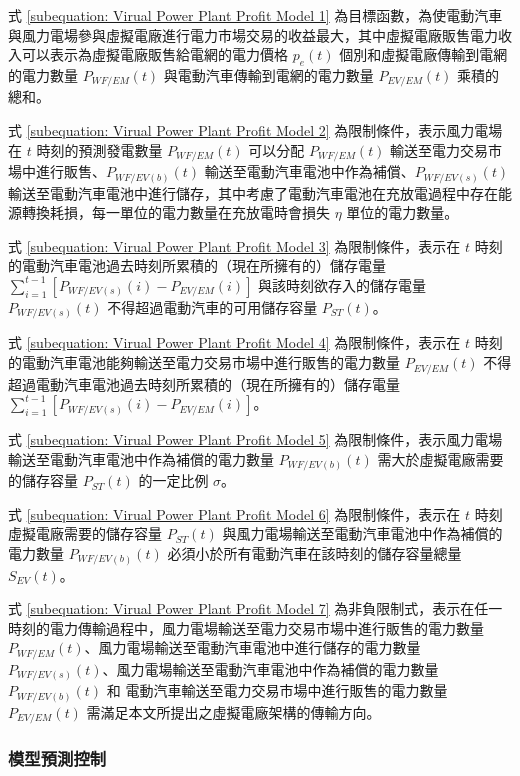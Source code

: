 式 \eqref{subequation: Virual Power Plant Profit Model 1} 為目標函數，為使電動汽車與風力電場參與虛擬電廠進行電力市場交易的收益最大，其中虛擬電廠販售電力收入可以表示為虛擬電廠販售給電網的電力價格 $p_{e} (t)$ 個別和虛擬電廠傳輸到電網的電力數量 $P_{WF/EM}(t)$ 與電動汽車傳輸到電網的電力數量 $P_{EV/EM}(t)$ 乘積的總和。

式 \eqref{subequation: Virual Power Plant Profit Model 2} 為限制條件，表示風力電場在 $t$ 時刻的預測發電數量 $P_{WF/EM}(t)$ 可以分配 $P_{WF/EM}(t)$ 輸送至電力交易市場中進行販售、$P_{WF/EV(b)}(t)$ 輸送至電動汽車電池中作為補償、$P_{WF/EV(s)}(t)$ 輸送至電動汽車電池中進行儲存，其中考慮了電動汽車電池在充放電過程中存在能源轉換耗損，每一單位的電力數量在充放電時會損失 $\eta$ 單位的電力數量。

式 \eqref{subequation: Virual Power Plant Profit Model 3} 為限制條件，表示在 $t$ 時刻的電動汽車電池過去時刻所累積的（現在所擁有的）儲存電量 $\sum_{i=1}^{t-1} \left[ P_{WF/EV(s)}(i) - P_{EV/EM}(i) \right]$ 與該時刻欲存入的儲存電量 $P_{WF/EV(s)}(t)$ 不得超過電動汽車的可用儲存容量 $P_{ST}(t)$。

式 \eqref{subequation: Virual Power Plant Profit Model 4} 為限制條件，表示在 $t$ 時刻的電動汽車電池能夠輸送至電力交易市場中進行販售的電力數量 $P_{EV/EM}(t)$ 不得超過電動汽車電池過去時刻所累積的（現在所擁有的）儲存電量 $\sum_{i=1}^{t-1} \left[ P_{WF/EV(s)}(i) - P_{EV/EM}(i) \right]$。

式 \eqref{subequation: Virual Power Plant Profit Model 5} 為限制條件，表示風力電場輸送至電動汽車電池中作為補償的電力數量 $P_{WF/EV(b)}(t)$
 需大於虛擬電廠需要的儲存容量 $P_{ST}(t)$ 的一定比例 $\sigma$。

式 \eqref{subequation: Virual Power Plant Profit Model 6} 為限制條件，表示在 $t$ 時刻虛擬電廠需要的儲存容量 $P_{ST}(t)$ 與風力電場輸送至電動汽車電池中作為補償的電力數量 $P_{WF/EV(b)}(t)$ 必須小於所有電動汽車在該時刻的儲存容量總量 $S_{EV}(t)$。

式 \eqref{subequation: Virual Power Plant Profit Model 7} 為非負限制式，表示在任一時刻的電力傳輸過程中，風力電場輸送至電力交易市場中進行販售的電力數量 $P_{WF/EM}(t)$、風力電場輸送至電動汽車電池中進行儲存的電力數量 $P_{WF/EV(s)}(t)$、風力電場輸送至電動汽車電池中作為補償的電力數量 $P_{WF/EV(b)}(t)$ 和 電動汽車輸送至電力交易市場中進行販售的電力數量 $P_{EV/EM}(t)$ 需滿足本文所提出之虛擬電廠架構的傳輸方向。

\subsubsection{模型預測控制}

